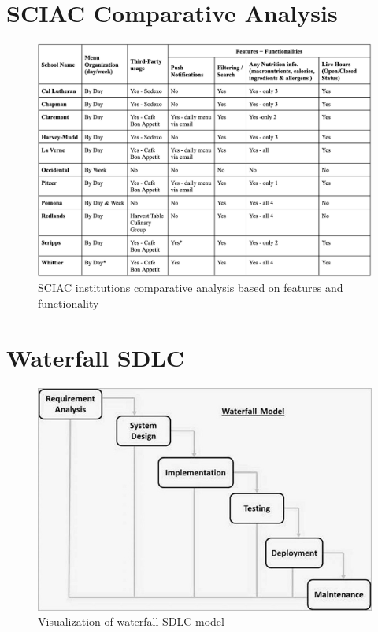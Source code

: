 \documentclass[10pt,twocolumn]{article}
\begin{document}
\section
{SCIAC Comparative Analysis} \label{appendix-test}
\begin{figure}[H]
    \centering
    \includegraphics[width=.95\linewidth]{images/sciac-compare.png} %
    \caption{
        SCIAC institutions comparative analysis based on features and functionality 
    }\label{sciac-compare}
\end{figure}
\section{Waterfall SDLC} \label{waterfall-sldc}
\begin{figure}[H]
    \centering
    \includegraphics[width=.95\linewidth]{images/sdlc_waterfall_model.jpg} %
    \caption{
        Visualization of waterfall SDLC model
    }
\end{figure}
\end{document}
